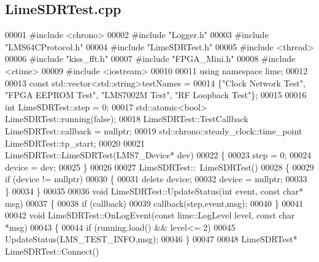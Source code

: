 \subsection{Lime\+S\+D\+R\+Test.\+cpp}
\label{LimeSDRTest_8cpp_source}

\begin{DoxyCode}
00001 \textcolor{preprocessor}{#include <chrono>}
00002 \textcolor{preprocessor}{#include "Logger.h"}
00003 \textcolor{preprocessor}{#include "LMS64CProtocol.h"}
00004 \textcolor{preprocessor}{#include "LimeSDRTest.h"}
00005 \textcolor{preprocessor}{#include <thread>}
00006 \textcolor{preprocessor}{#include "kiss_fft.h"}
00007 \textcolor{preprocessor}{#include "FPGA_Mini.h"}
00008 \textcolor{preprocessor}{#include <ctime>}
00009 \textcolor{preprocessor}{#include <iostream>}
00010 
00011 \textcolor{keyword}{using namespace }lime;
00012 
00013 \textcolor{keyword}{const} std::vector<std::string>testNames =
00014 \{\textcolor{stringliteral}{"Clock Network Test"}, \textcolor{stringliteral}{"FPGA EEPROM Test"}, \textcolor{stringliteral}{"LMS7002M Test"}, \textcolor{stringliteral}{"RF Loopback Test"}\};
00015 
00016 \textcolor{keywordtype}{int} LimeSDRTest::step = 0;
00017 std::atomic<bool> LimeSDRTest::running(\textcolor{keyword}{false});
00018 LimeSDRTest::TestCallback LimeSDRTest::callback = \textcolor{keyword}{nullptr};
00019 std::chrono::steady\_clock::time\_point LimeSDRTest::tp_start;
00020 
00021 LimeSDRTest::LimeSDRTest(LMS7_Device* dev)
00022 \{
00023     step = 0;
00024     device = dev;
00025 \}
00026 
00027 LimeSDRTest::~LimeSDRTest()
00028 \{
00029     \textcolor{keywordflow}{if} (device != \textcolor{keyword}{nullptr})
00030     \{
00031         \textcolor{keyword}{delete} device;
00032         device = \textcolor{keyword}{nullptr};
00033     \}
00034 \}
00035 
00036 \textcolor{keywordtype}{void} LimeSDRTest::UpdateStatus(\textcolor{keywordtype}{int} event, \textcolor{keyword}{const} \textcolor{keywordtype}{char}* msg)
00037 \{
00038     \textcolor{keywordflow}{if} (callback)
00039         callback(step,event,msg);
00040 \}
00041 
00042 \textcolor{keywordtype}{void} LimeSDRTest::OnLogEvent(\textcolor{keyword}{const} lime::LogLevel level, \textcolor{keyword}{const} \textcolor{keywordtype}{char} *msg)
00043 \{
00044     \textcolor{keywordflow}{if} (running.load() && level<= 2)
00045         UpdateStatus(LMS_TEST_INFO,msg);
00046 \}
00047 
00048 LimeSDRTest* LimeSDRTest::Connect()

\end{DoxyCode}
